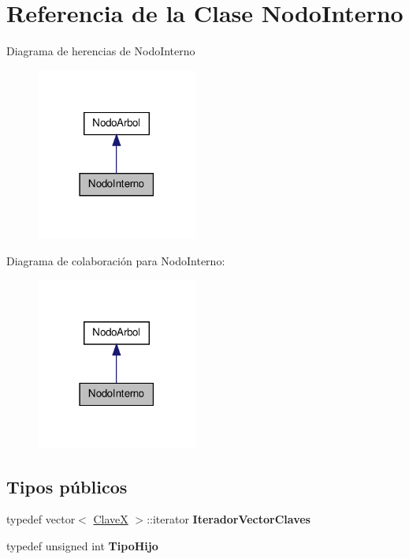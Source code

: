 \hypertarget{class_nodo_interno}{\section{\-Referencia de la \-Clase \-Nodo\-Interno}
\label{class_nodo_interno}
}


\-Diagrama de herencias de \-Nodo\-Interno
\nopagebreak
\begin{figure}[H]
\begin{center}
\leavevmode
\includegraphics[width=150pt]{class_nodo_interno__inherit__graph}
\end{center}
\end{figure}


\-Diagrama de colaboración para \-Nodo\-Interno\-:
\nopagebreak
\begin{figure}[H]
\begin{center}
\leavevmode
\includegraphics[width=150pt]{class_nodo_interno__coll__graph}
\end{center}
\end{figure}
\subsection*{\-Tipos públicos}
\begin{DoxyCompactItemize}
\item 
\hypertarget{class_nodo_interno_a8a75c95764b6a641dc16fbb9ad39bcb8}{typedef vector$<$ \hyperlink{class_clave_x}{\-Clave\-X} $>$\-::iterator {\bfseries \-Iterador\-Vector\-Claves}}\label{class_nodo_interno_a8a75c95764b6a641dc16fbb9ad39bcb8}

\item 
\hypertarget{class_nodo_interno_ad1badd4d0f17df29c031392e40456dca}{typedef unsigned int {\bfseries \-Tipo\-Hijo}}\label{class_nodo_interno_ad1badd4d0f17df29c031392e40456dca}

\end{DoxyCompactItemize}
